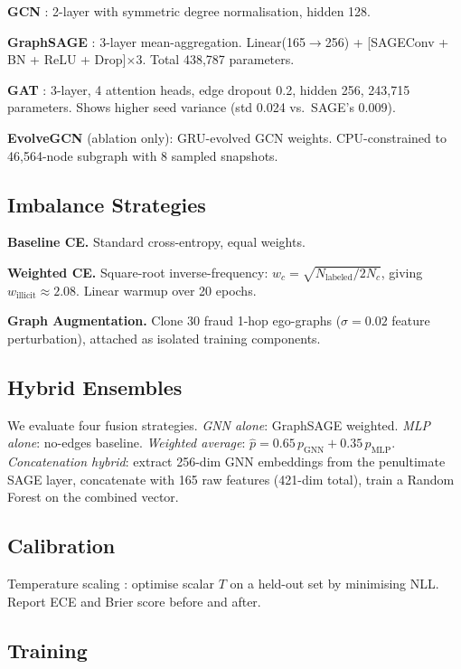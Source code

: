 \documentclass[journal,10pt,twoside]{IEEEtran}
\begin{document}
\textbf{GCN} \cite{kipf2017}: 2-layer with symmetric degree
normalisation, hidden 128.

\textbf{GraphSAGE} \cite{hamilton2017}: 3-layer mean-aggregation.
Linear(165$\to$256) + [SAGEConv + BN + ReLU + Drop]$\times$3.
Total 438,787 parameters.

\textbf{GAT} \cite{velickovic2018}: 3-layer, 4 attention heads, edge
dropout 0.2, hidden 256, 243,715 parameters. Shows higher seed
variance (std 0.024 vs.\ SAGE's 0.009).

\textbf{EvolveGCN} \cite{pareja2020evolvegcn} (ablation only):
GRU-evolved GCN weights. CPU-constrained to 46,564-node subgraph
with 8 sampled snapshots.

\subsection{Imbalance Strategies}

\textbf{Baseline CE.} Standard cross-entropy, equal weights.

\textbf{Weighted CE.} Square-root inverse-frequency:
$w_c = \sqrt{N_\text{labeled}/2N_c}$, giving
$w_\text{illicit}\approx 2.08$. Linear warmup over 20 epochs.

\textbf{Graph Augmentation.} Clone 30 fraud 1-hop ego-graphs
($\sigma\!=\!0.02$ feature perturbation), attached as isolated
training components.

\subsection{Hybrid Ensembles}

We evaluate four fusion strategies. \emph{GNN alone}: GraphSAGE
weighted. \emph{MLP alone}: no-edges baseline. \emph{Weighted
average}: $\hat{p} = 0.65\,p_\text{GNN} + 0.35\,p_\text{MLP}$.
\emph{Concatenation hybrid}: extract 256-dim GNN embeddings from the
penultimate SAGE layer, concatenate with 165 raw features (421-dim
total), train a Random Forest \cite{breiman2001rf} on the combined
vector.

\subsection{Calibration}

Temperature scaling \cite{guo2017calibration}: optimise scalar $T$
on a held-out set by minimising NLL. Report ECE
\cite{naeini2015calibration} and Brier score before and after.

\subsection{Training}
\end{document}
